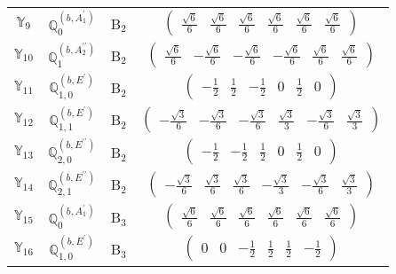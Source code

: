 \documentclass[fleqn,10pt,landscape]{article}
\begin{document}
\begin{itemize}
\begin{center}
\begin{longtable}{c|c|c|c}
$ \mathbb{Y}_{9} $ & $\mathbb{Q}_{0}^{(b,A_{1}^{\prime})}$ & B$_{2}$ & $\begin{pmatrix} \frac{\sqrt{6}}{6} & \frac{\sqrt{6}}{6} & \frac{\sqrt{6}}{6} & \frac{\sqrt{6}}{6} & \frac{\sqrt{6}}{6} & \frac{\sqrt{6}}{6} \end{pmatrix}$ \\
$ \mathbb{Y}_{10} $ & $\mathbb{Q}_{1}^{(b,A_{2}^{\prime\prime})}$ & B$_{2}$ & $\begin{pmatrix} \frac{\sqrt{6}}{6} & - \frac{\sqrt{6}}{6} & - \frac{\sqrt{6}}{6} & - \frac{\sqrt{6}}{6} & \frac{\sqrt{6}}{6} & \frac{\sqrt{6}}{6} \end{pmatrix}$ \\
$ \mathbb{Y}_{11} $ & $\mathbb{Q}_{1,0}^{(b,E^{\prime})}$ & B$_{2}$ & $\begin{pmatrix} - \frac{1}{2} & \frac{1}{2} & - \frac{1}{2} & 0 & \frac{1}{2} & 0 \end{pmatrix}$ \\
$ \mathbb{Y}_{12} $ & $\mathbb{Q}_{1,1}^{(b,E^{\prime})}$ & B$_{2}$ & $\begin{pmatrix} - \frac{\sqrt{3}}{6} & - \frac{\sqrt{3}}{6} & - \frac{\sqrt{3}}{6} & \frac{\sqrt{3}}{3} & - \frac{\sqrt{3}}{6} & \frac{\sqrt{3}}{3} \end{pmatrix}$ \\
$ \mathbb{Y}_{13} $ & $\mathbb{Q}_{2,0}^{(b,E^{\prime\prime})}$ & B$_{2}$ & $\begin{pmatrix} - \frac{1}{2} & - \frac{1}{2} & \frac{1}{2} & 0 & \frac{1}{2} & 0 \end{pmatrix}$ \\
$ \mathbb{Y}_{14} $ & $\mathbb{Q}_{2,1}^{(b,E^{\prime\prime})}$ & B$_{2}$ & $\begin{pmatrix} - \frac{\sqrt{3}}{6} & \frac{\sqrt{3}}{6} & \frac{\sqrt{3}}{6} & - \frac{\sqrt{3}}{3} & - \frac{\sqrt{3}}{6} & \frac{\sqrt{3}}{3} \end{pmatrix}$ \\ \hline
$ \mathbb{Y}_{15} $ & $\mathbb{Q}_{0}^{(b,A_{1}^{\prime})}$ & B$_{3}$ & $\begin{pmatrix} \frac{\sqrt{6}}{6} & \frac{\sqrt{6}}{6} & \frac{\sqrt{6}}{6} & \frac{\sqrt{6}}{6} & \frac{\sqrt{6}}{6} & \frac{\sqrt{6}}{6} \end{pmatrix}$ \\
$ \mathbb{Y}_{16} $ & $\mathbb{Q}_{1,0}^{(b,E^{\prime})}$ & B$_{3}$ & $\begin{pmatrix} 0 & 0 & - \frac{1}{2} & \frac{1}{2} & \frac{1}{2} & - \frac{1}{2} \end{pmatrix}$ \\

\end{longtable}
\end{center}
\end{itemize}
\end{document}
